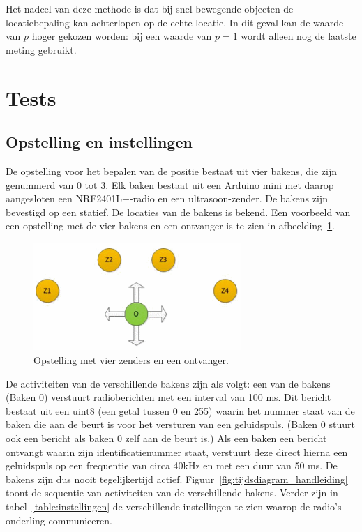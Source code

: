 \documentclass[a4paper,10pt]{article}
\begin{document}
Het nadeel van deze methode is dat bij snel bewegende objecten de locatiebepaling kan achterlopen op de echte locatie. In dit geval kan de waarde van $p$ hoger gekozen worden: bij een waarde van $p = 1$ wordt alleen nog de laatste meting gebruikt.

\section{Tests}\label{sec:tests}
\subsection{Opstelling en instellingen}\label{sec:opstelling}
De opstelling voor het bepalen van de positie bestaat uit vier bakens, die zijn genummerd van 0 tot 3. Elk baken bestaat uit een Arduino mini met daarop aangesloten een NRF2401L+-radio en een ultrasoon-zender. De bakens zijn bevestigd op een statief. De locaties van de bakens is bekend. Een voorbeeld van een opstelling met de vier bakens en een ontvanger is te zien in afbeelding~\ref{fig:opstelling}.

\begin{figure}[ht!]
    \centering
    \includegraphics[width=0.7\textwidth]{opstelling.png}
    \caption{Opstelling met vier zenders en een ontvanger.}
    \label{fig:opstelling}
\end{figure}

De activiteiten van de verschillende bakens zijn als volgt: een van de bakens (Baken 0) verstuurt radioberichten met een interval van 100 ms. Dit bericht bestaat uit een uint8 (een getal tussen 0 en 255) waarin het nummer staat van de baken die aan de beurt is voor het versturen van een geluidspuls. (Baken 0 stuurt ook een bericht als baken 0 zelf aan de beurt is.) Als een baken een bericht ontvangt waarin zijn identiﬁcatienummer staat, verstuurt deze direct hierna een geluidspuls op een frequentie van circa 40kHz en met een duur van 50 ms. De bakens zijn dus nooit tegelijkertijd actief. Figuur~\ref{fig:tijdsdiagram_handleiding} toont de sequentie van activiteiten van de verschillende bakens. Verder zijn in tabel~\ref{table:instellingen} de verschillende instellingen te zien waarop de radio’s onderling communiceren.
\end{document}
